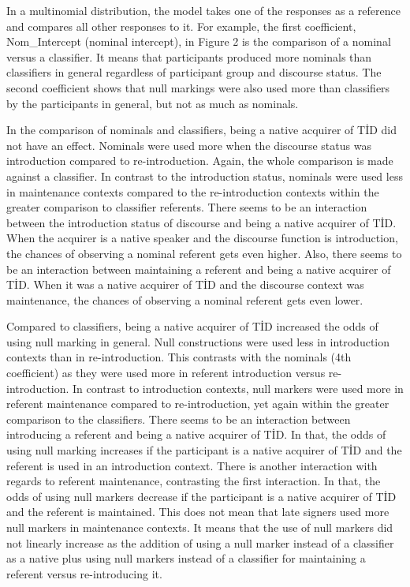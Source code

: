 \documentclass[review]{elsarticle} %
\begin{document}
In a multinomial distribution, the model takes one of the responses as a
reference and compares all other responses to it. For example, the first
coefficient, Nom\_Intercept (nominal intercept), in Figure 2 is the
comparison of a nominal versus a classifier. It means that participants
produced more nominals than classifiers in general regardless of
participant group and discourse status. The second coefficient shows
that null markings were also used more than classifiers by the
participants in general, but not as much as nominals.

In the comparison of nominals and classifiers, being a native acquirer
of TİD did not have an effect. Nominals were used more when the
discourse status was introduction compared to re-introduction. Again,
the whole comparison is made against a classifier. In contrast to the
introduction status, nominals were used less in maintenance contexts
compared to the re-introduction contexts within the greater comparison
to classifier referents. There seems to be an interaction between the
introduction status of discourse and being a native acquirer of TİD.
When the acquirer is a native speaker and the discourse function is
introduction, the chances of observing a nominal referent gets even
higher. Also, there seems to be an interaction between maintaining a
referent and being a native acquirer of TİD. When it was a native
acquirer of TİD and the discourse context was maintenance, the chances
of observing a nominal referent gets even lower.

Compared to classifiers, being a native acquirer of TİD increased the
odds of using null marking in general. Null constructions were used less
in introduction contexts than in re-introduction. This contrasts with
the nominals (4th coefficient) as they were used more in referent
introduction versus re-introduction. In contrast to introduction
contexts, null markers were used more in referent maintenance compared
to re-introduction, yet again within the greater comparison to the
classifiers. There seems to be an interaction between introducing a
referent and being a native acquirer of TİD. In that, the odds of using
null marking increases if the participant is a native acquirer of TİD
and the referent is used in an introduction context. There is another
interaction with regards to referent maintenance, contrasting the first
interaction. In that, the odds of using null markers decrease if the
participant is a native acquirer of TİD and the referent is maintained.
This does not mean that late signers used more null markers in
maintenance contexts. It means that the use of null markers did not
linearly increase as the addition of using a null marker instead of a
classifier as a native plus using null markers instead of a classifier
for maintaining a referent versus re-introducing it.
\end{document}
